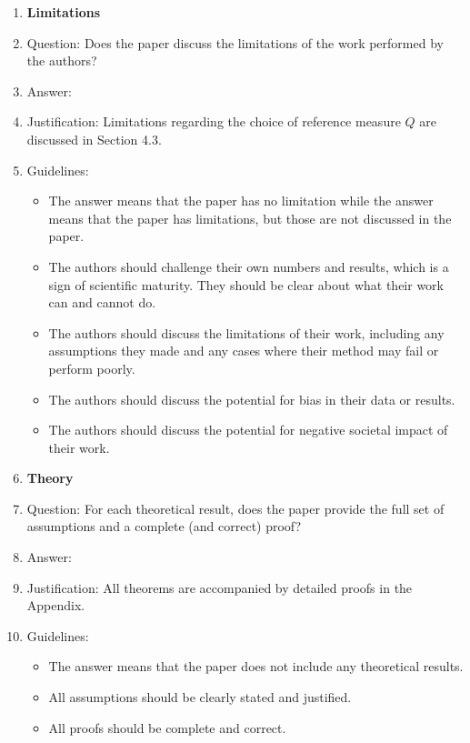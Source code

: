 \begin{enumerate}
\item {\bf Limitations}
    \item[] Question: Does the paper discuss the limitations of the work performed by the authors?
    \item[] Answer: \answerYes{}
    \item[] Justification: Limitations regarding the choice of reference measure $Q$ are discussed in Section 4.3.
    \item[] Guidelines:
    \begin{itemize}
        \item The answer \answerNA{} means that the paper has no limitation while the answer \answerNo{} means that the paper has limitations, but those are not discussed in the paper. 
        \item The authors should challenge their own numbers and results, which is a sign of scientific maturity. They should be clear about what their work can and cannot do. 
        \item The authors should discuss the limitations of their work, including any assumptions they made and any cases where their method may fail or perform poorly. 
        \item The authors should discuss the potential for bias in their data or results.
        \item The authors should discuss the potential for negative societal impact of their work.
    \end{itemize}

\item {\bf Theory}
    \item[] Question: For each theoretical result, does the paper provide the full set of assumptions and a complete (and correct) proof?
    \item[] Answer: \answerYes{}
    \item[] Justification: All theorems are accompanied by detailed proofs in the Appendix.
    \item[] Guidelines:
    \begin{itemize}
        \item The answer \answerNA{} means that the paper does not include any theoretical results. 
        \item All assumptions should be clearly stated and justified. 
        \item All proofs should be complete and correct. 
    \end{itemize}


\end{enumerate}
